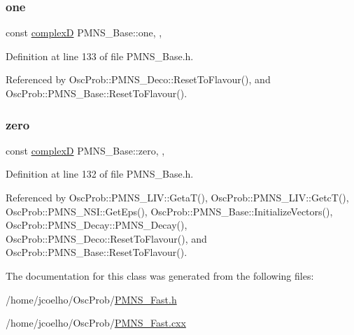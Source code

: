 \subsubsection{\texorpdfstring{one}{one}}
{\footnotesize\ttfamily const \hyperlink{EigenPoint_8h_a67ca8e107e20610c3fff78d5e726ece0}{complexD} P\+M\+N\+S\+\_\+\+Base\+::one\hspace{0.3cm}{\ttfamily [static]}, {\ttfamily [protected]}, {\ttfamily [inherited]}}



Definition at line 133 of file P\+M\+N\+S\+\_\+\+Base.\+h.



Referenced by Osc\+Prob\+::\+P\+M\+N\+S\+\_\+\+Deco\+::\+Reset\+To\+Flavour(), and Osc\+Prob\+::\+P\+M\+N\+S\+\_\+\+Base\+::\+Reset\+To\+Flavour().

\mbox{\label{classOscProb_1_1PMNS__Base_a05e595848c2521dc795efa7645728b94}} 
\subsubsection{\texorpdfstring{zero}{zero}}
{\footnotesize\ttfamily const \hyperlink{EigenPoint_8h_a67ca8e107e20610c3fff78d5e726ece0}{complexD} P\+M\+N\+S\+\_\+\+Base\+::zero\hspace{0.3cm}{\ttfamily [static]}, {\ttfamily [protected]}, {\ttfamily [inherited]}}



Definition at line 132 of file P\+M\+N\+S\+\_\+\+Base.\+h.



Referenced by Osc\+Prob\+::\+P\+M\+N\+S\+\_\+\+L\+I\+V\+::\+Geta\+T(), Osc\+Prob\+::\+P\+M\+N\+S\+\_\+\+L\+I\+V\+::\+Getc\+T(), Osc\+Prob\+::\+P\+M\+N\+S\+\_\+\+N\+S\+I\+::\+Get\+Eps(), Osc\+Prob\+::\+P\+M\+N\+S\+\_\+\+Base\+::\+Initialize\+Vectors(), Osc\+Prob\+::\+P\+M\+N\+S\+\_\+\+Decay\+::\+P\+M\+N\+S\+\_\+\+Decay(), Osc\+Prob\+::\+P\+M\+N\+S\+\_\+\+Deco\+::\+Reset\+To\+Flavour(), and Osc\+Prob\+::\+P\+M\+N\+S\+\_\+\+Base\+::\+Reset\+To\+Flavour().



The documentation for this class was generated from the following files\+:\begin{DoxyCompactItemize}
\item 
/home/jcoelho/\+Osc\+Prob/\hyperlink{PMNS__Fast_8h}{P\+M\+N\+S\+\_\+\+Fast.\+h}\item 
/home/jcoelho/\+Osc\+Prob/\hyperlink{PMNS__Fast_8cxx}{P\+M\+N\+S\+\_\+\+Fast.\+cxx}\end{DoxyCompactItemize}
